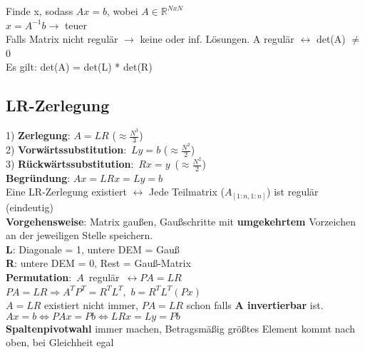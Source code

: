 Finde x, sodass $Ax = b$, wobei $A \in \mathbb{R}^{NxN}$\\
$x = A^{-1}b \rightarrow$ teuer\\
Falls Matrix nicht regulär $\rightarrow$ keine oder inf. Lösungen. A regulär $\leftrightarrow$ det(A) $\neq$ 0\\
Es gilt: det(A) = det(L) * det(R)
\subsection{LR-Zerlegung}
1) \textbf{Zerlegung}: $A = LR$ ($\approx \frac{N^3}{3}$)\\
2) \mbox{\textbf{Vorwärtssubstitution}: $Ly = b$} ($\approx \frac{N^2}{2}$)\\
3) \mbox{\textbf{Rückwärtssubstitution}: $Rx = y$ ($\approx \frac{N^2}{2}$)}\\
\textbf{Begründung}: $Ax = LRx = Ly = b$\\
Eine LR-Zerlegung existiert $\leftrightarrow$ Jede Teilmatrix ($A_{[1:n,1:n]}$) ist regulär (eindeutig)\\
\textbf{Vorgehensweise}: Matrix gaußen, Gaußschritte mit \textbf{umgekehrtem} Vorzeichen an der jeweiligen Stelle speichern.\\
\textbf{L}: Diagonale = 1, untere DEM = Gauß\\
\textbf{R}: untere DEM = 0, Rest = Gauß-Matrix\\
\mbox{\textbf{Permutation}: $A$ regulär $\leftrightarrow PA = LR$}\\
\mbox{$PA = LR \Rightarrow A^TP^T = R^TL^T$, $b = R^TL^T(Px)$}\\
$A = LR$ existiert nicht immer, $PA = LR$ schon falls \textbf{A invertierbar} ist.\\
$Ax = b \Leftrightarrow PAx = Pb \Leftrightarrow LRx = Ly = Pb$\\
\textbf{Spaltenpivotwahl} immer machen, Betragsmäßig größtes Element kommt nach oben, bei Gleichheit egal

